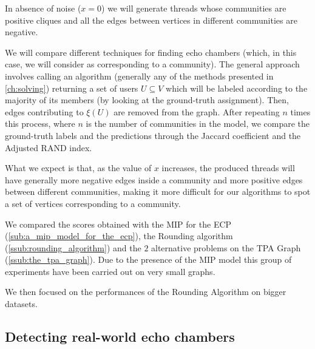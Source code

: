 In absence of noise ($x = 0$) we will generate threads whose communities are
positive cliques and all the edges between vertices in different communities
are negative.

We will compare different techniques for finding echo chambers (which,
in this case, we will consider as corresponding to a community). The general
approach involves calling an algorithm (generally any of the methods presented
in \autoref{ch:solving}) returning a set of users $U \subseteq V$ which will be
labeled according to the majority of its members (by looking at the
ground-truth assignment). Then, edges contributing to $\xi(U)$
are removed from the graph.  After repeating $n$ times this process, where $n$ is the number
of communities in the model, we compare the ground-truth labels and the
predictions through the Jaccard coefficient and the Adjusted RAND
index\footnotemark.


What we expect is that, as the value of $x$ increases, the produced threads
will have generally more negative edges inside a community and more positive
edges between different communities, making it more difficult for our
algorithms to spot a set of vertices corresponding to a community.


We compared the scores obtained with the \acrshort{MIP} for the \acrshort{ECP}
(\autoref{sub:a_mip_model_for_the_ecp}), the Rounding algorithm
(\autoref{ssub:rounding_algorithm}) and the $2$ alternative problems on the
\acrshort{TPA} Graph (\autoref{ssub:the_tpa_graph}). Due to the presence of the
\acrshort{MIP} model this group of experiments have been carried out on very
small graphs.

We then focused on the performances of the Rounding Algorithm on bigger
datasets.


\subsection{Detecting real-world echo chambers}%
\label{sub:detecting_real_echo_chambers}

